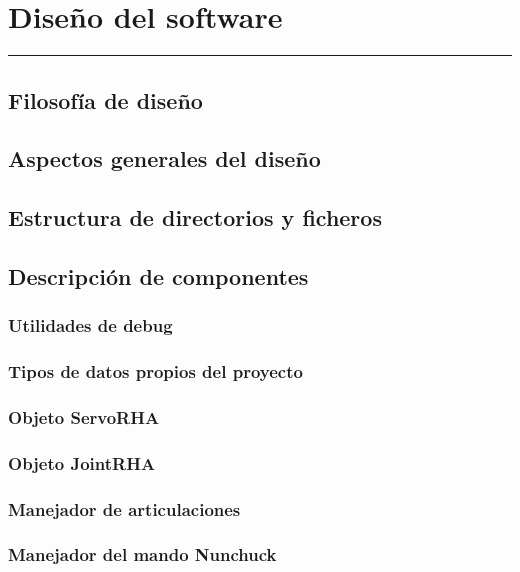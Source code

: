 \chapter{Diseño del software} \label{chap:SW}
\hrule
\vspace{3mm}

\section{Filosofía de diseño} \label{sec:SW:filosofia_diseno}

\section{Aspectos generales del diseño} \label{sec:SW:diseño_general}

\section{Estructura de directorios y ficheros} \label{sec:SW:estructura_dir}

\section{Descripción de componentes} \label{sec:SW:descripcion_componentes}

    \subsection{Utilidades de debug} \label{subsec:SW:debug}
    \subsection{Tipos de datos propios del proyecto} \label{subsec:SW:rhatypes}
    \subsection{Objeto ServoRHA} \label{subsec:SW:servorha}
    \subsection{Objeto JointRHA} \label{subsec:SW:jointrha}
    \subsection{Manejador de articulaciones} \label{subsec:SW:joint_handler}
    \subsection{Manejador del mando Nunchuck} \label{subsec:SW:chuck_handler}
